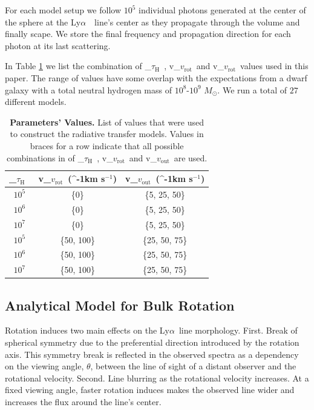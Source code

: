 \documentclass[a4paper,fleqn,usenatbib]{mnras}
\newcommand{\lya}{\ifmmode{{\rm Ly}\alpha}\else Ly$\alpha$\ \fi}
\newcommand{\kms}{\ifmmode\mathrm{km\ s}^{-1}\else km s$^{-1}$\fi}
\newcommand{\vrot}{\ifmmode\mathrm v_{\mathrm{rot}}\else $v_{\mathrm{rot}}$~\fi}
\newcommand{\vout}{\ifmmode\mathrm v_{\mathrm{out}}\else $v_{\mathrm{out}}$~\fi}
\newcommand{\tauh}{\ifmmode\mathrm \tau_{\mathrm{H}}\else $\tau_{\mathrm{H}}$~\fi}
\begin{document}
For each model setup we follow $10^5$ individual photons generated at
the center of the sphere at the \lya\ line's center as they propagate
through the volume and finally scape.
We store the final frequency and propagation direction for each photon
at its last scattering.  

In Table \ref{tab:values} we list the combination of \tauh,
\vrot and \vrot values used in this paper.
The range of values have some overlap with the expectations from a dwarf
galaxy with a total neutral hydrogen mass of $10^8$-$10^9$ $M_{\odot}$.
We run a total of $27$ different models.

\begin{table}
  \begin{center}
    \begin{tabular}{|c|c|c|}
      \hline
      \tauh & \vrot (\kms) & \vout (\kms) \\
      \hline
      $10^5$ & \{0\} & \{5, 25, 50\} \\
      $10^6$ & \{0\} & \{5, 25, 50\}\\
      $10^7$ & \{0\} & \{5, 25, 50\}\\
      $10^5$ & \{50, 100\} & \{25, 50, 75\} \\
      $10^6$ & \{50, 100\} & \{25, 50, 75\}\\
      $10^7$ & \{50, 100\} & \{25, 50, 75\}\\
      \hline    
    \end{tabular}
  \end{center}
  \caption{\textbf{Parameters' Values.} List of values that were used
    to construct the radiative transfer models. Values in braces
    for a row indicate that all possible combinations in of
    \tauh, \vrot and \vout are used.}
  \label{tab:values}
\end{table}


\subsection{Analytical Model for Bulk Rotation}

Rotation induces two main effects on the \lya line morphology.
First. Break of spherical symmetry due to the 
preferential direction introduced by the rotation axis.
This symmetry break is reflected in the observed spectra as a
dependency on the viewing angle, $\theta$, between the line of sight
of a distant observer and the rotational velocity.    
Second. Line blurring as the rotational velocity increases.
At a fixed viewing angle, faster rotation induces makes the observed
line wider and increases the flux around the line's center. 
\end{document}
